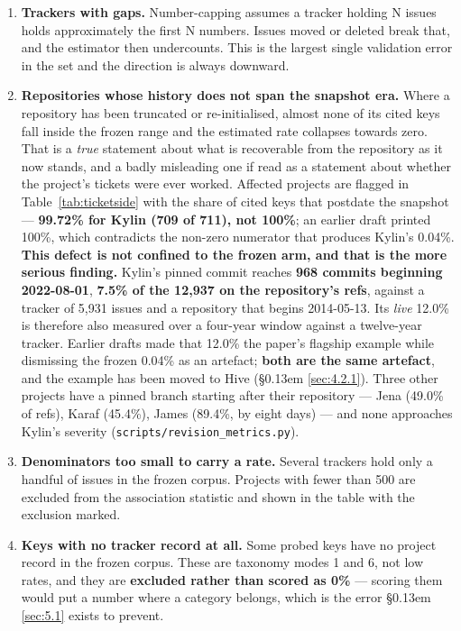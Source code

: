 \documentclass[11pt,a4paper]{article}
\begin{document}
\begin{enumerate}
\item \textbf{Trackers with gaps.} Number-capping assumes a tracker holding N issues holds approximately the first N numbers. Issues moved or deleted break that, and the estimator then undercounts. This is the largest single validation error in the set and the direction is always downward.
\item \textbf{Repositories whose history does not span the snapshot era.} Where a repository has been truncated or re-initialised, almost none of its cited keys fall inside the frozen range and the estimated rate collapses towards zero. That is a \emph{true} statement about what is recoverable from the repository as it now stands, and a badly misleading one if read as a statement about whether the project's tickets were ever worked. Affected projects are flagged in Table~\ref{tab:ticketside} with the share of cited keys that postdate the snapshot --- \textbf{99.72\% for Kylin (709 of 711), not 100\%}; an earlier draft printed 100\%, which contradicts the non-zero numerator that produces Kylin's 0.04\%.
\textbf{This defect is not confined to the frozen arm, and that is the more serious finding.} Kylin's pinned commit reaches \textbf{968 commits beginning 2022-08-01}, \textbf{7.5\% of the 12,937 on the repository's refs}, against a tracker of 5,931 issues and a repository that begins 2014-05-13. Its \emph{live} 12.0\% is therefore also measured over a four-year window against a twelve-year tracker. Earlier drafts made that 12.0\% the paper's flagship example while dismissing the frozen 0.04\% as an artefact; \textbf{both are the same artefact}, and the example has been moved to Hive (\S\kern0.13em \ref{sec:4.2.1}). Three other projects have a pinned branch starting after their repository --- Jena (49.0\% of refs), Karaf (45.4\%), James (89.4\%, by eight days) --- and none approaches Kylin's severity (\texttt{scripts/\allowbreak{}revision\_\allowbreak{}metrics.\allowbreak{}py}).

\item \textbf{Denominators too small to carry a rate.} Several trackers hold only a handful of issues in the frozen corpus. Projects with fewer than 500 are excluded from the association statistic and shown in the table with the exclusion marked.
\item \textbf{Keys with no tracker record at all.} Some probed keys have no project record in the frozen corpus. These are taxonomy modes 1 and 6, not low rates, and they are \textbf{excluded rather than scored as 0\%} --- scoring them would put a number where a category belongs, which is the error \S\kern0.13em \ref{sec:5.1} exists to prevent.
\end{enumerate}
\end{document}
